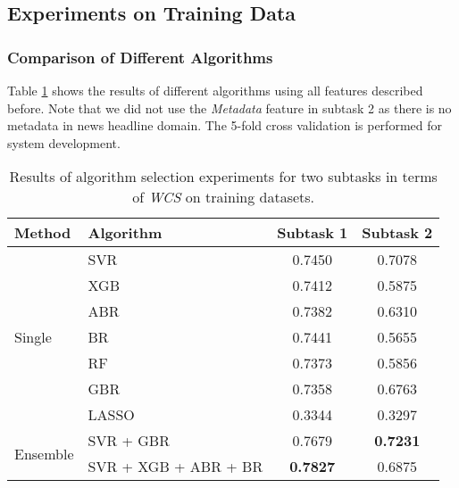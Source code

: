 \documentclass[11pt,a4paper]{article}
\begin{document}
\subsection{Experiments on Training Data}

\subsubsection{Comparison of Different Algorithms}
\label{algorithm}

Table \ref{Table:algorithm-selection} shows the results of different algorithms using all features described before. Note that we did not use the \emph{Metadata} feature in subtask 2 as there is no metadata in news headline domain. The 5-fold cross validation is performed for system development.
\begin{table}[!htbp]
\addtolength{\tabcolsep}{-4pt}
\small
\begin{tabular}{l|l|cc}
  \hline
  \hline
  Method & Algorithm & Subtask 1 & Subtask 2 \\
  \hline

  \multirow{7}{*}{Single} & SVR & 0.7450 & 0.7078 \\
  & XGB & 0.7412 & 0.5875 \\
  & ABR & 0.7382 & 0.6310 \\
  & BR & 0.7441 & 0.5655 \\
  & RF & 0.7373 & 0.5856 \\
  & GBR & 0.7358 & 0.6763 \\
  & LASSO & 0.3344 & 0.3297 \\
  \hline
  \multirow{2}{*}{Ensemble} & SVR + GBR  & 0.7679 & \textbf{0.7231} \\
  & SVR + XGB + ABR + BR  & \textbf{0.7827} & 0.6875 \\
  \hline
  \hline
\end{tabular}
\caption{Results of algorithm selection experiments for two subtasks in terms of \emph{WCS} on training datasets.}
\label{Table:algorithm-selection}
\end{table}
\end{document}
